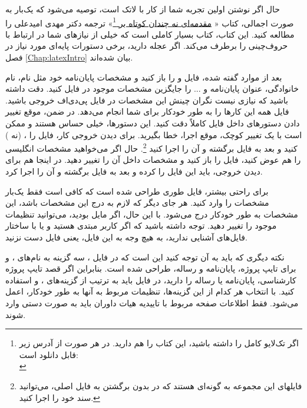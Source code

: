  حال اگر نوشتن \پ اولین تجربه شما از کار با لاتک است، توصیه می‌شود که یک‌بار به صورت اجمالی، کتاب «%
\href{http://www.tug.ctan.org/tex-archive/info/lshort/persian/lshort.pdf}{مقدمه‌ای نه چندان کوتاه بر
\lr{\LaTeXe}}\footnote{اگر تک‌لایو کامل را داشته باشید، این کتاب را هم دارید. در هر صورت از آدرس زیر قابل دانلود است:\\
}»
   ترجمه دکتر مهدی امیدعلی را مطالعه کنید. این کتاب، کتاب بسیار کاملی است که خیلی از نیازهای شما در ارتباط با حروف‌چینی را برطرف می‌کند.
اگر عجله دارید، برخی دستورات پایه‌ای مورد نیاز در فصل \ref{Chap:latexIntro} بیان شده‌اند.
 
 
بعد از موارد گفته شده، فایل 
و
را باز کنید و مشخصات پایان‌نامه خود مثل نام، نام خانوادگی، عنوان پایان‌نامه و ... را جایگزین مشخصات موجود در فایل
 کنید. دقت داشته باشید که نیازی نیست 
نگران چینش این مشخصات در فایل پی‌دی‌اف خروجی باشید. فایل 
همه این کارها را به طور خودکار برای شما انجام می‌دهد. در ضمن، موقع تغییر دادن دستورهای داخل فایل
 کاملاً دقت کنید. این دستورها، خیلی حساس هستند و ممکن است با یک تغییر کوچک، موقع اجرا، خطا بگیرید. برای دیدن خروجی کار، فایل 
 را 
، 
(نه 
)
کنید و بعد به فایل 
برگشته و آن را اجرا کنید
\footnote{فایلهای این مجموعه به گونه‌ای هستند که در   بدون برگشتن به فایل اصلی، می‌توانید سند خود را اجرا کنید. }.
 حال اگر می‌خواهید مشخصات انگلیسی \پ را هم عوض کنید، فایل 
را باز کنید و مشخصات داخل آن را تغییر دهید.%
 در اینجا هم برای دیدن خروجی، باید این فایل را 
کرده و بعد به فایل 
برگشته و آن را اجرا کرد.

برای راحتی بیشتر، 
فایل 
طوری طراحی شده است که کافی است فقط  یک‌بار مشخصات \پ  را وارد کنید. هر جای دیگر که لازم به درج این مشخصات باشد، این مشخصات به طور خودکار درج می‌شود. با این حال، اگر مایل بودید، می‌توانید تنظیمات موجود را تغییر دهید. توجه داشته باشید که اگر کاربر مبتدی هستید و یا با ساختار فایل‌های  
 آشنایی ندارید، به هیچ وجه به این فایل، یعنی فایل 
دست نزنید.

نکته دیگری که باید به آن توجه کنید این است که در فایل 
،
سه گزینه به نام‌های
،
و
برای تایپ پروژه، پایان‌نامه و رساله،
طراحی شده است. بنابراین اگر قصد تایپ پروژه کارشناسی، پایان‌نامه یا رساله را دارید، 
 در فایل 
باید به ترتیب از گزینه‌های
،
و
استفاده کنید. با انتخاب هر کدام از این گزینه‌ها، تنظیمات مربوط به آنها به طور خودکار، اعمل می‌شود.    
فقط اطلاعات صفحه مربوط با تاییدیه هیات داوران باید به صورت دستی وارد شوند.


